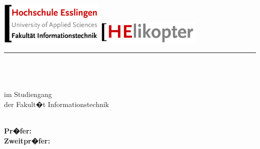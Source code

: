 \newcommand{\HRule}[2]{\noindent\rule[#1]{\linewidth}{#2}} %
\newcommand{\vlinespace}[1]{\vspace*{#1\baselineskip}} %
\newcommand{\titleemph}[1]{\textbf{#1}} %

\begin{titlepage}
 \sffamily %
      \includegraphics[width=5cm]{fig/aa-titel/HE_IT_Logo}\hfill    
      \includegraphics[width=5cm]{fig/aa-titel/HElikopter_Logo}
      \HRule{13pt}{2pt} 
   \centering
      \Large
      \vlinespace{3}\\
      \workTyp\\
      \huge
      \workTitel\\
%
      \Large
      \vlinespace{2}
          im Studiengang \workStudiengang\\
          der Fakult�t Informationstechnik\\
%      
      \workSemester\\
%     
      \vlinespace{2}
      \workNameStudent
%
   \vfill
   \raggedright
%   
   \large
   \titleemph{Pr�fer:} \workPruefer \\
   \titleemph{Zweitpr�fer:} \workZweitPruefer \\ %

%
\end{titlepage}
